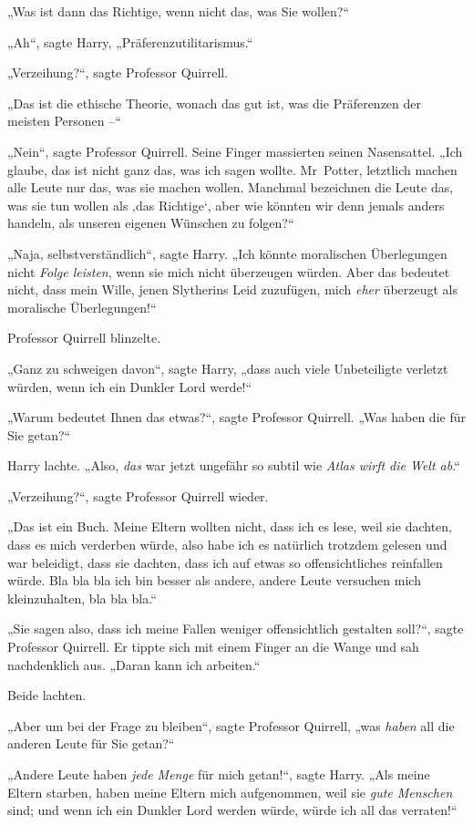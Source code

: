 {„Was ist dann das Richtige, wenn nicht das, was Sie wollen?“

„Ah“, sagte Harry, „Präferenzutilitarismus.“

„Verzeihung?“, sagte Professor Quirrell.

„Das ist die ethische Theorie, wonach das gut ist, was die Präferenzen der meisten Personen --“

„Nein“, sagte Professor Quirrell. Seine Finger massierten seinen Nasensattel. „Ich glaube, das ist nicht ganz das, was ich sagen wollte. Mr~Potter, letztlich machen alle Leute nur das, was sie machen wollen. Manchmal bezeichnen die Leute das, was sie tun wollen als ‚das Richtige`, aber wie könnten wir denn jemals anders handeln, als unseren eigenen Wünschen zu folgen?“

„Naja, selbstverständlich“, sagte Harry. „Ich könnte moralischen Überlegungen nicht \emph{Folge leisten}, wenn sie mich nicht überzeugen würden. Aber das bedeutet nicht, dass mein Wille, jenen Slytherins Leid zuzufügen, mich \emph{eher} überzeugt als moralische Überlegungen!“

Professor Quirrell blinzelte.

„Ganz zu schweigen davon“, sagte Harry, „dass auch viele Unbeteiligte verletzt würden, wenn ich ein Dunkler Lord werde!“

„Warum bedeutet Ihnen das etwas?“, sagte Professor Quirrell. „Was haben die für Sie getan?“

Harry lachte. „Also, \emph{das} war jetzt ungefähr so subtil wie \emph{Atlas wirft die Welt ab}.“

„Verzeihung?“, sagte Professor Quirrell wieder.

„Das ist ein Buch. Meine Eltern wollten nicht, dass ich es lese, weil sie dachten, dass es mich verderben würde, also habe ich es natürlich trotzdem gelesen und war beleidigt, dass sie dachten, dass ich auf etwas so offensichtliches reinfallen würde. Bla bla bla ich bin besser als andere, andere Leute versuchen mich kleinzuhalten, bla bla bla.“

„Sie sagen also, dass ich meine Fallen weniger offensichtlich gestalten soll?“, sagte Professor Quirrell. Er tippte sich mit einem Finger an die Wange und sah nachdenklich aus. „Daran kann ich arbeiten.“

Beide lachten.

„Aber um bei der Frage zu bleiben“, sagte Professor Quirrell, „was \emph{haben} all die anderen Leute für Sie getan?“

„Andere Leute haben \emph{jede Menge} für mich getan!“, sagte Harry. „Als meine Eltern starben, haben meine Eltern mich aufgenommen, weil sie \emph{gute Menschen} sind; und wenn ich ein Dunkler Lord werden würde, würde ich all das verraten!“

}
